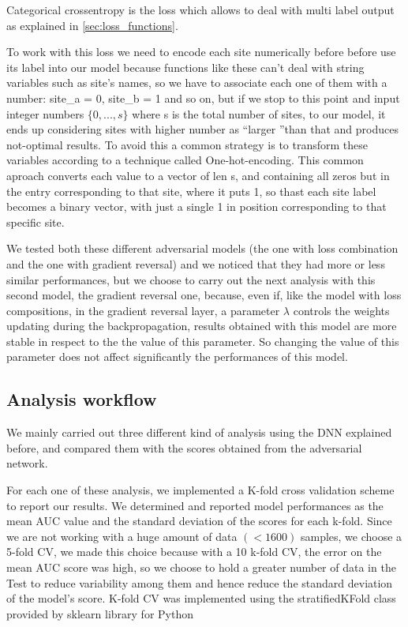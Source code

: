 \documentclass[a4paper,11pt]{article}
\begin{document}
Categorical crossentropy is the loss which allows to deal with multi label output as explained in \ref{sec:loss_functions}.
\begin{notes}
\item To work with this loss we need to encode each site numerically before before use its label into our model because functions like these can't deal with string variables such as site's names, so we have to associate each one of them with a number: site\_a = 0, site\_b = 1 and so on, but if we stop to this point and input integer numbers $\{0, ..., s\}$ where s is the total number of sites, to our model, it ends up considering sites with higher number as \textquotedblleft larger \textquotedblright than that and produces not-optimal results.
To avoid this a common strategy is to transform these variables according to a technique called One-hot-encoding.
This common aproach converts each value to a vector of len s, and containing all zeros but in the entry corresponding to that site, where it puts 1, so thast each site label becomes a binary vector, with just a single 1 in position corresponding to that specific site.
\end{notes}

We tested both these different adversarial models (the one with loss combination and the one with gradient reversal) and we noticed that they had more or less similar performances, but we choose to carry out the next analysis with this second model, the gradient reversal one, because, even if, like the model with loss compositions, in the gradient reversal layer, a parameter $\lambda$ controls the weights updating during the backpropagation,
results obtained with this model are more stable in respect to the the value of this parameter.
So changing the value of this parameter does not affect significantly the performances of this model.
\newpage
\subsection{Analysis workflow}
We mainly carried out three different kind of analysis using the DNN explained before, and compared them with the scores obtained from the adversarial network.

For each one of these analysis, we implemented a K-fold cross validation scheme to report our results. We determined and reported model performances as the mean AUC value and the standard deviation of the scores for each k-fold.
Since we are not working with a huge amount of data $(< 1600)$ samples, we choose a 5-fold CV, we made this choice because with a 10 k-fold CV, the error on the mean AUC score was high, so we choose to hold a greater number of data in the Test to reduce variability among them and hence reduce the standard deviation of the model's score.
K-fold CV was implemented using the stratifiedKFold class provided by sklearn library for Python
\end{document}
